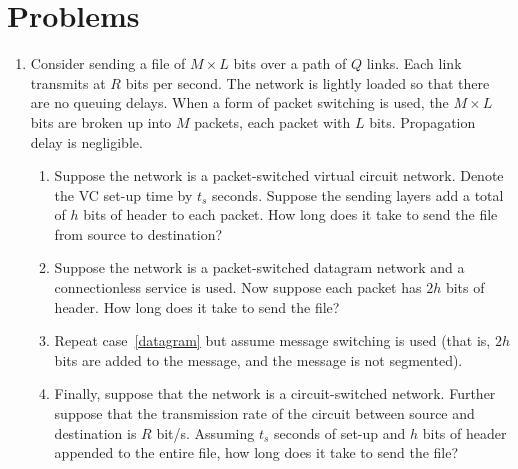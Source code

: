 \documentclass[11pt,a4paper]{article}
\begin{document}
\section{Problems}

\begin{enumerate}

  \item Consider sending a file of \(M \times L\) bits over a path of
    \(Q\) links. Each link transmits at \(R\) bits per second. The
    network is lightly loaded so that there are no queuing
    delays. When a form of packet switching is used, the \(M \times
    L\) bits are broken up into \(M\) packets, each packet with \(L\)
    bits. Propagation delay is negligible.
    \begin{enumerate}

      \item Suppose the network is a packet-switched virtual circuit
        network. Denote the VC set-up time by \(t_s\) seconds. Suppose
        the sending layers add a total of \(h\) bits of header to each
        packet. How long does it take to send the file from source to
        destination?

      \item \label{datagram} Suppose the network is a packet-switched
        datagram network and a connectionless service is used. Now
        suppose each packet has \(2h\) bits of header. How long does
        it take to send the file?

      \item Repeat case~\ref{datagram} but assume message switching is
        used (that is, \(2h\) bits are added to the message, and the
        message is not segmented).

      \item Finally, suppose that the network is a circuit-switched
        network. Further suppose that the transmission rate of the
        circuit between source and destination is \(R\)
        bit/s. Assuming \(t_s\) seconds of set-up and \(h\) bits of
        header appended to the entire file, how long does it take to
        send the file?

    \end{enumerate}


\end{enumerate}
\end{document}
